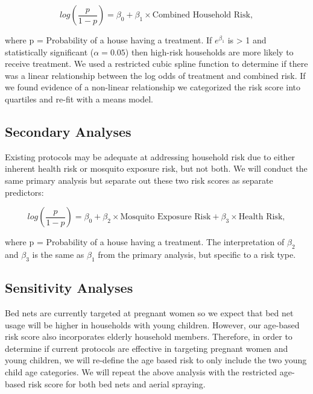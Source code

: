 \documentclass{article}\usepackage[]{graphicx}\usepackage[]{color}
\begin{document}
$$log(\frac{p}{1-p}) = \beta_0 + \beta_1 \times \text{Combined Household Risk}, $$

where p  =  Probability of a house having a treatment.  If $e^{\beta_1}$ is > 1 and statistically significant ($\alpha = 0.05$) then high-risk households are more likely to receive treatment.  We used a restricted cubic spline function to determine if there was a linear relationship between the log odds of treatment and combined risk.  If we found evidence of a non-linear relationship we categorized the risk score into quartiles and re-fit with a means model. 

\subsection{Secondary Analyses}

Existing protocols may be adequate at addressing household risk due to either inherent health risk or mosquito exposure risk,  but not both.  We will conduct the same primary analysis but separate out these two risk scores as separate predictors:

$$log(\frac{p}{1-p}) = \beta_0 + \beta_2 \times \text{Mosquito Exposure Risk} + \beta_3 \times \text{Health Risk}, $$

where p  =  Probability of a house having a treatment.  The interpretation of $\beta_2$ and $\beta_3$ is the same as $\beta_1$ from the primary analysis,  but specific to a risk type.


\subsection{Sensitivity Analyses}

Bed nets are currently targeted at pregnant women so we expect that bed net usage will be higher in households with young children.  However,  our age-based risk score also incorporates elderly household members.  Therefore,  in order to determine if current protocols are effective in targeting pregnant women and young children,  we will re-define the age based risk to only include the two young child age categories. We will repeat the above analysis with the restricted age-based risk score for both bed nets and aerial spraying.
\end{document}
